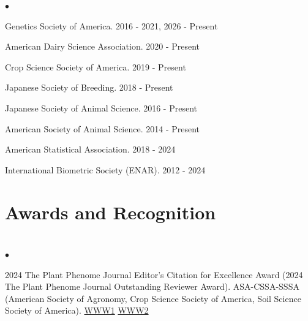 \documentclass[margin,line,10pt]{res}
\newenvironment{list2}{
  \begin{list}{$\bullet$}{%
      \setlength{\itemsep}{0in}
      \setlength{\parsep}{0in} \setlength{\parskip}{0in}
      \setlength{\topsep}{0in} \setlength{\partopsep}{0in} 
      \setlength{\leftmargin}{0.2in}}}{\end{list}}
\begin{document}
\begin{resume}
\begin{list2}
  \item  Genetics Society of America. 2016 - 2021, 2026 - Present
  \vspace{0.3cm}
  \item American Dairy Science Association. 2020 - Present
    \vspace{0.3cm}
  \item Crop Science Society of America. 2019 - Present
    \vspace{0.3cm}
  \item  Japanese Society of Breeding. 2018 - Present
      \vspace{0.3cm}
\item  Japanese Society of Animal Science. 2016 - Present
  \vspace{0.3cm}
\item American Society of Animal Science. 2014 - Present
    \vspace{0.3cm}
        \item American Statistical Association. 2018 - 2024
    \vspace{0.3cm}
\item International Biometric Society (ENAR). 2012 - 2024

\end{list2}


\vspace{0.5cm}
\section{\sc Awards and Recognition}
\vspace{1cm}

\section{}
\begin{list2}
  \item 2024 The Plant Phenome Journal Editor's Citation for Excellence Award (2024 The Plant Phenome Journal Outstanding Reviewer Award). ASA-CSSA-SSSA (American Society of Agronomy, Crop Science Society of America, Soil Science Society of America). \textcolor{blue}{\href{https://www.sciencesocieties.org/publications/csa-news/2025/june/2025-journal-outstanding-editors-reviewers?q=publications/csa-news/2025/june/2025-journal-outstanding-editors-reviewers/}{WWW1}} \textcolor{blue}{\href{https://doi.org/10.1002/ppj2.70043}{WWW2}}
\end{list2}


\end{resume}
\end{document}
